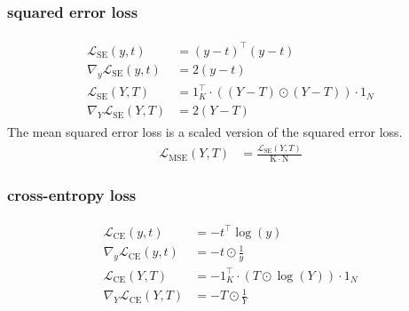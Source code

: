 \documentclass{article}
\newcommand{\const}[1]{\ensuremath{\mathrm{#1}}} %
\begin{document}
\subsubsection*{squared error loss}
\begin{align}
\begin{split}
  \mathcal{L}_\text{SE}(y, t) &= (y - t)^\top (y - t)
  \\
  \nabla_y \mathcal{L}_\text{SE}(y, t) &= 2(y - t)
  \\
  \mathcal{L}_\text{SE}(Y, T) &= 1_K^\top \cdot ((Y - T) \odot (Y - T)) \cdot 1_N
  \\
  \nabla_Y \mathcal{L}_\text{SE}(Y, T) &= 2(Y - T)
\end{split}  
\end{align}
The mean squared error loss is a scaled version of the squared error loss.
\begin{align*}
  \mathcal{L}_\text{MSE}(Y, T) &= \frac{\mathcal{L}_\text{SE}(Y, T)} {\const{K} \cdot \const{N}}
\end{align*}

\subsubsection*{cross-entropy loss}
\begin{align}
\begin{split}
  \mathcal{L}_\text{CE}(y, t) &= - t^\top \log(y)
  \\
  \nabla_y \mathcal{L}_\text{CE}(y, t) &= - t \odot \frac{1}{y}
  \\
  \mathcal{L}_\text{CE}(Y, T) &= - 1_K^\top \cdot (T \odot \log(Y)) \cdot 1_N
  \\
  \nabla_Y \mathcal{L}_\text{CE}(Y, T) &= -T \odot \frac{1}{Y}
\end{split} 
\end{align}
\end{document}
